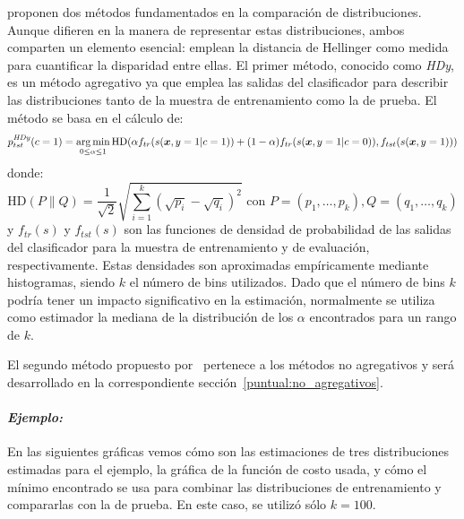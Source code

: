 \citet{gonzalez2013class} proponen dos métodos fundamentados en la comparación
de distribuciones. Aunque difieren en la manera de representar estas
distribuciones, ambos comparten un elemento esencial: emplean la distancia de
Hellinger como medida para cuantificar la disparidad entre ellas. El primer
método, conocido como {\it HDy}, es un método agregativo ya que emplea las
salidas del clasificador para describir las distribuciones tanto de la muestra
de entrenamiento como la de prueba. El método se basa en el cálculo de:
\begin{equation}\label{ecuacion:hdy}
    p^{\it HDy \/}_{tst}(c=1) = \operatorname*{arg\,min}_{0 \leq \alpha \leq 1}{\text{HD}}(\alpha f_{tr}{(s(\boldsymbol{x},y=1|c=1))}+(1-\alpha) f_{tr}{(s(\boldsymbol{x},y=1|c=0))}, f_{tst}{(s(\boldsymbol{x},y=1))})
\end{equation}
donde:
\begin{equation}\label{ecuacion:hd}
    {\text{HD}}(P \parallel Q)= \frac{1}{\sqrt{2}}{\sqrt {\sum _{i=1}^{k}{({\sqrt {p_{i}}}-{\sqrt {q_{i}}})}^{2}}} \text{ con } P=(p_1,\dots,p_k), Q=(q_1,\dots,q_k)
\end{equation}
y $f_{tr}(s)$ y $f_{tst}(s)$ son las funciones de densidad de probabilidad de
las salidas del clasificador para la muestra de entrenamiento y de evaluación,
respectivamente. Estas densidades son aproximadas empíricamente mediante
histogramas, siendo $k$ el número de bins utilizados. Dado que el número de bins
$k$ podría tener un impacto significativo en la estimación, normalmente se
utiliza como estimador la mediana de la distribución de los $\alpha$ encontrados
para un rango de $k$.

El segundo método propuesto por~\citet{gonzalez2013class} pertenece a los
métodos no agregativos y será desarrollado en la correspondiente
sección~\ref{puntual:no_agregativos}.

\paragraph{\it Ejemplo:\/} En las siguientes gráficas vemos cómo son las
estimaciones de tres distribuciones estimadas para el ejemplo, la gráfica de la
función de costo usada, y cómo el mínimo encontrado se usa para combinar las
distribuciones de entrenamiento y compararlas con la de prueba. En este caso, se
utilizó sólo $k=100$.

